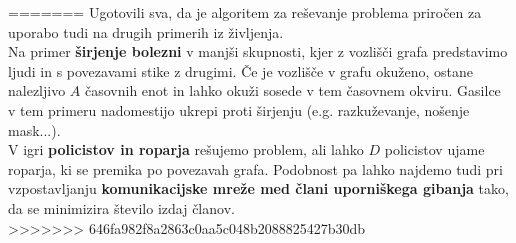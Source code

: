\documentclass[a4paper, 12pt]{article}
\begin{document}


=======
\noindent Ugotovili sva, da je algoritem za reševanje problema priročen
za uporabo tudi na drugih primerih iz življenja. \\
Na primer \textbf{širjenje bolezni} v manjši skupnosti, kjer z vozlišči grafa predstavimo ljudi 
in s povezavami stike z drugimi. Če je vozlišče v grafu okuženo, ostane nalezljivo 
$A$ časovnih enot in lahko okuži sosede v tem časovnem okviru. Gasilce v tem
primeru nadomestijo ukrepi proti širjenju (e.g. razkuževanje, nošenje mask...). \\
V igri \textbf{policistov in roparja} rešujemo problem, ali lahko $D$ policistov ujame roparja, ki se 
premika po povezavah grafa. 
Podobnost pa lahko najdemo tudi pri vzpostavljanju \textbf{komunikacijske mreže med člani uporniškega gibanja}
tako, da se minimizira število izdaj članov. \\
 
% 
% 
>>>>>>> 646fa982f8a2863c0aa5c048b2088825427b30db

\end{document}
